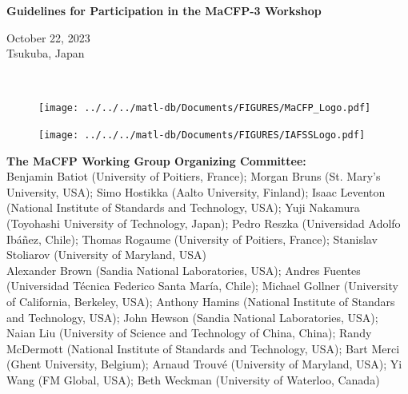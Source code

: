 \documentclass[12pt]{article}
\begin{document}

\thispagestyle{empty}


\vspace*{0.75in}

\begin{center}
\begin{Large}
{\bf Guidelines for Participation in the MaCFP-3 Workshop} \\
\end{Large}
\begin{large}
October 22, 2023\\
Tsukuba, Japan
\end{large}
\hspace{1in} \\
\end{center}


\begin{figure}[h]
  \centering
  \texttt{[image: ../../../matl-db/Documents/FIGURES/MaCFP\_Logo.pdf]}
  \label{Cover_Image}
\end{figure}

\vfill

\begin{minipage}{0.25\textwidth}
\begin{figure}[H]
\texttt{[image: ../../../matl-db/Documents/FIGURES/IAFSSLogo.pdf]}
\end{figure}
\end{minipage} \hfill
\begin{minipage}{0.65\textwidth}
\begin{flushright}
\begin{small}
{\bf The MaCFP Working Group Organizing Committee:} \\
{\footnotesize Benjamin Batiot (University of Poitiers, France); Morgan Bruns (St. Mary's University, USA); Simo Hostikka (Aalto University, Finland); Isaac Leventon (National Institute of Standards and Technology, USA); Yuji Nakamura (Toyohashi University of Technology, Japan); Pedro Reszka (Universidad Adolfo Ibáñez, Chile); Thomas Rogaume (University of Poitiers, France); Stanislav Stoliarov (University of Maryland, USA)}\\
{\footnotesize Alexander Brown (Sandia National Laboratories, USA); Andres Fuentes (Universidad Técnica Federico Santa María, Chile); Michael Gollner (University of California, Berkeley, USA); Anthony Hamins (National Institute of Standars and Technology, USA); John Hewson (Sandia National Laboratories, USA); Naian Liu (University of Science and Technology of China, China); Randy McDermott (National Institute of Standards and Technology, USA); Bart Merci (Ghent University, Belgium); Arnaud Trouvé (University of Maryland, USA); Yi Wang (FM Global, USA); Beth Weckman (University of Waterloo, Canada)}


\end{small}
\end{flushright}
\end{minipage}
\end{document}
